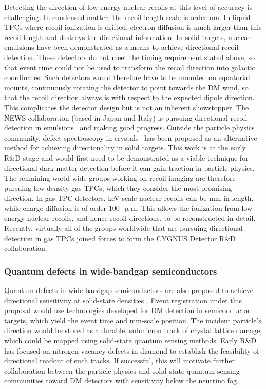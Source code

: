 Detecting the direction of low-energy nuclear recoils at this level of accuracy is challenging. In condensed matter, the recoil length scale is order nm. In liquid TPCs where recoil ionization is drifted, electron diffusion is much larger than this recoil length and destroys the directional information. In solid targets, nuclear emulsions have been demonstrated as a means to achieve directional recoil detection. These detectors do not meet the timing requirement stated above, so that event time could not be used to transform the recoil direction into galactic coordinates. Such detectors would therefore have to be mounted on equatorial mounts, continuously rotating the detector to point towards the DM wind, so that the recoil direction always is with respect to the expected dipole direction. This complicates the detector design but is not an inherent showstopper. The NEWS collaboration (based in Japan and Italy) is pursuing directional recoil detection in emulsions~\cite{NEWS:2016fyf} and making good progress. Outside the particle physics community, defect spectroscopy in crystals~\cite{Marshall:2020azl} has been proposed as an alternative method for achieving directionality in solid targets. This work is at the early R\&D stage and would first need to be demonstrated as a viable technique for directional dark matter detection before it can gain traction in particle physics. The remaining world-wide groups working on recoil imaging are therefore pursuing low-density gas TPCs, which they consider the most promising direction. In gas TPC detectors, keV-scale nuclear recoils can be mm in length, while charge diffusion is of order 100~$\upmu$m. This allows the ionization from low-energy nuclear recoils, and hence recoil directions, to be reconstructed in detail. Recently, virtually all of the groups worldwide that are pursuing directional detection in gas TPCs joined forces to form the CYGNUS Detector R\&D collaboration.

\subsubsection{Quantum defects in wide-bandgap semiconductors}
 Quantum defects in wide-bandgap semiconductors are also proposed to achieve directional sensitivity at solid-state densities \cite{Rajendran:2017ynw,Marshall:2020azl, the snowmass whitepaper}. Event registration under this proposal would use technologies developed for DM detection in semiconductor targets, which yield the event time and mm-scale position. The incident particle's direction would be stored as a durable, submicron track of crystal lattice damage, which could be mapped using solid-state quantum sensing methods. Early R\&D has focused on nitrogen-vacancy defects in diamond \cite{Marshall:2020azl,Marshall:2021kjk,Marshall:2021xiu} to establish the feasibility of directional readout of such tracks. If successful, this will motivate further collaboration between the particle physics and solid-state quantum sensing communities toward DM detectors with sensitivity below the neutrino fog.
 
